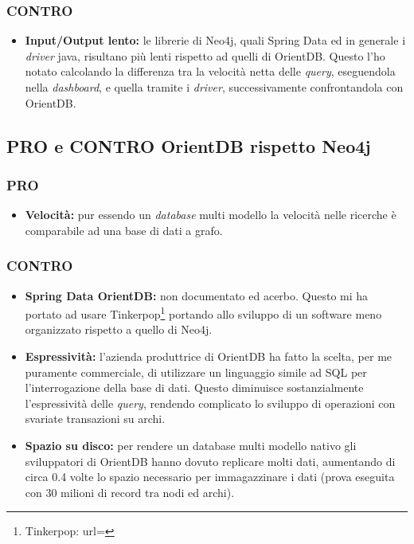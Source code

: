 \subsubsection{CONTRO}
\begin{itemize}
\item{\textbf{Input/Output lento:}} le librerie di Neo4j, quali Spring Data ed in generale i \textit{driver} java, risultano più lenti rispetto ad quelli di OrientDB. Questo l'ho notato calcolando la differenza tra la velocità netta delle \textit{query}, eseguendola nella \textit{dashboard}, e quella tramite i \textit{driver}, successivamente confrontandola con OrientDB.
\end{itemize}
\subsection{PRO e CONTRO OrientDB rispetto Neo4j}
\subsubsection{PRO}
\begin{itemize}
\item{\textbf{Velocità:}} pur essendo un \textit{database} multi modello la velocità nelle ricerche è comparabile ad una base di dati a grafo.
\end{itemize}
\subsubsection{CONTRO}
\begin{itemize}
\item{\textbf{Spring Data OrientDB:}} non documentato ed acerbo. Questo mi ha portato ad usare Tinkerpop\footnote{Tinkerpop: url= } portando allo sviluppo di un software meno organizzato rispetto a quello di Neo4j.
\item{\textbf{Espressività:}} l'azienda produttrice di OrientDB ha fatto la scelta, per me puramente commerciale, di utilizzare un linguaggio simile ad \gls{SQL} per l'interrogazione della base di dati. Questo diminuisce sostanzialmente l'espressività delle \textit{query}, rendendo complicato lo sviluppo di operazioni con svariate transazioni su archi.
\item{\textbf{Spazio su disco:}} per rendere un database multi modello nativo gli sviluppatori di OrientDB hanno dovuto replicare molti dati, aumentando di circa 0.4 volte lo spazio necessario per immagazzinare i dati (prova eseguita con 30 milioni di record tra nodi ed archi).
\end{itemize}

